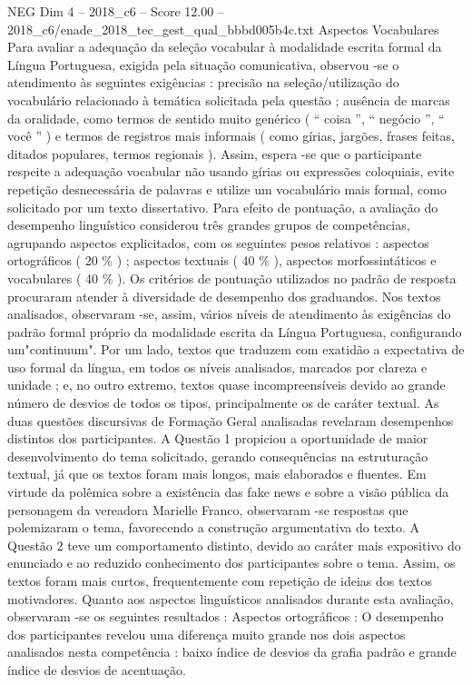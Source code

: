 \begin{textsample}{NEG Dim 4 – 2018\_c6 – Score 12.00 – 2018\_c6/enade\_2018\_tec\_gest\_qual\_bbbd005b4c.txt}
Aspectos Vocabulares Para avaliar a adequação da seleção vocabular à modalidade escrita formal da Língua Portuguesa, exigida pela situação comunicativa, observou -se o atendimento às seguintes exigências : precisão na seleção/utilização do vocabulário relacionado à temática solicitada pela questão ; ausência de marcas da oralidade, como termos de sentido muito genérico ( “ coisa ”, “ negócio ”, “ você ” ) e termos de registros mais informais ( como gírias, jargões, frases feitas, ditados populares, termos regionais ).
Assim, espera -se que o participante respeite a adequação vocabular não usando gírias ou expressões coloquiais, evite repetição desnecessária de palavras e utilize um vocabulário mais formal, como solicitado por um texto dissertativo.
Para efeito de pontuação, a avaliação do desempenho linguístico considerou três grandes grupos de competências, agrupando aspectos explicitados, com os seguintes pesos relativos : aspectos ortográficos ( 20 \% ) ; aspectos textuais ( 40 \% ), aspectos morfossintáticos e vocabulares ( 40 \% ).
Os critérios de pontuação utilizados no padrão de resposta procuraram atender à diversidade de desempenho dos graduandos.
Nos textos analisados, observaram -se, assim, vários níveis de atendimento às exigências do padrão formal próprio da modalidade escrita da Língua Portuguesa, configurando um"continuum".
Por um lado, textos que traduzem com exatidão a expectativa de uso formal da língua, em todos os níveis analisados, marcados por clareza e unidade ; e, no outro extremo, textos quase incompreensíveis devido ao grande número de desvios de todos os tipos, principalmente os de caráter textual.
As duas questões discursivas de Formação Geral analisadas revelaram desempenhos distintos dos participantes.
A Questão 1 propiciou a oportunidade de maior desenvolvimento do tema solicitado, gerando consequências na estruturação textual, já que os textos foram mais longos, mais elaborados e fluentes.
Em virtude da polêmica sobre a existência das fake news e sobre a visão pública da personagem da vereadora Marielle Franco, observaram -se respostas que polemizaram o tema, favorecendo a construção argumentativa do texto.
A Questão 2 teve um comportamento distinto, devido ao caráter mais expositivo do enunciado e ao reduzido conhecimento dos participantes sobre o tema.
Assim, os textos foram mais curtos, frequentemente com repetição de ideias dos textos motivadores.
Quanto aos aspectos linguísticos analisados durante esta avaliação, observaram -se os seguintes resultados : Aspectos ortográficos : O desempenho dos participantes revelou uma diferença muito grande nos dois aspectos analisados nesta competência : baixo índice de desvios da grafia padrão e grande índice de desvios de acentuação.

\end{textsample}
